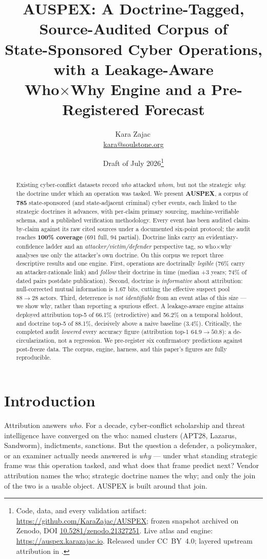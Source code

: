 \documentclass[11pt]{article}
\title{AUSPEX: A Doctrine-Tagged, Source-Audited Corpus of\\
State-Sponsored Cyber Operations, with a Leakage-Aware\\
Who$\times$Why Engine and a Pre-Registered Forecast}
\author{Kara Zajac\,\orcidlink{0009-0001-7400-1394}\\
\small \href{mailto:kara@soulstone.org}{kara@soulstone.org}}
\date{Draft of July 2026\thanks{Code, data, and every validation artifact:
\url{https://github.com/KaraZajac/AUSPEX}; frozen snapshot archived on Zenodo, DOI \href{https://doi.org/10.5281/zenodo.21327251}{10.5281/zenodo.21327251}.
Live atlas and engine: \url{https://auspex.karazajac.io}. Released under CC~BY~4.0; layered
upstream attribution in \code{DATA-RIGHTS.md}.}}
\begin{document}
\maketitle

\begin{abstract}
\noindent Existing cyber-conflict datasets record \emph{who} attacked \emph{whom}, but not the
strategic \emph{why}: the doctrine under which an operation was tasked. We present \textbf{AUSPEX},
a corpus of \textbf{785} state-sponsored (and state-adjacent criminal) cyber events, each linked to
the strategic doctrines it advances, with per-claim primary sourcing, machine-verifiable schema, and
a published verification methodology. Every event has been audited claim-by-claim against its raw
cited sources under a documented six-point protocol; the audit reaches \textbf{100\% coverage}
(691 full, 94 partial). Doctrine links carry an evidentiary-confidence ladder and an
\emph{attacker/victim/defender} perspective tag, so who$\times$why analyses use only the attacker's own
doctrine. On this corpus we report three descriptive results and one engine. First, operations are
doctrinally \emph{legible} (76\% carry an attacker-rationale link) and \emph{follow} their doctrine in
time (median $+3$ years; 74\% of dated pairs postdate publication). Second, doctrine is
\emph{informative} about attribution: null-corrected mutual information is $1.67$ bits, cutting the
effective suspect pool $88\!\rightarrow\!28$ actors. Third, deterrence is \emph{not identifiable}
from an event atlas of this size --- we show why, rather than reporting a spurious effect. A
leakage-aware engine attains deployed attribution top-5 of 66.1\% (retrodictive) and 56.2\% on a
temporal holdout, and doctrine top-5 of 88.1\%, decisively above a naive baseline (3.4\%). Critically,
the completed audit \emph{lowered} every accuracy figure (attribution top-1 $64.9\!\rightarrow\!50.8$):
a de-circularization, not a regression. We pre-register six confirmatory predictions against
post-freeze data. The corpus, engine, harness, and this paper's figures are fully reproducible.
\end{abstract}

\section{Introduction}

Attribution answers \emph{who}. For a decade, cyber-conflict scholarship and threat intelligence have
converged on the who: named clusters (APT28, Lazarus, Sandworm), indictments, sanctions. But the
question a defender, a policymaker, or an examiner actually needs answered is \emph{why} --- under what
standing strategic frame was this operation tasked, and what does that frame predict next? Vendor
attribution names the who; strategic doctrine names the why; and only the join of the two is a usable
object. AUSPEX is built around that join.
\end{document}
